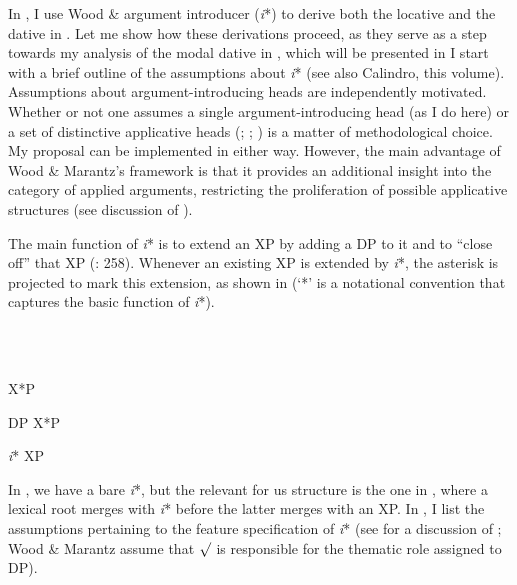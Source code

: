\documentclass[output=paper,modfonts,nonflat]{langsci/langscibook}
\begin{document}
In \citet{Tsedryk2019}, I use Wood \&  argument introducer (\textit{i}*) to derive both the locative and the dative in . Let me show how these derivations proceed, as they serve as a step towards my analysis of the modal dative in , which will be presented in  I start with a brief outline of the assumptions about \textit{i}* (see also Calindro, this volume). Assumptions about argument-introducing heads are independently motivated. Whether or not one assumes a single argument-introducing head (as I do here) or a set of distinctive applicative heads (\citealt{Pylkkänen2007}; \citealt{Cuervo2003}; \citealt{Markman2009}) is a matter of methodological choice. My proposal can be implemented in either way. However, the main advantage of Wood \& Marantz’s framework is that it provides an additional insight into the category of applied arguments, restricting the proliferation of possible applicative structures (see discussion of ).       

The main function of \textit{i}* is to extend an XP by adding a DP to it and to “close off” that XP (\citealt{WoodMarantz2017}: 258). Whenever an existing XP is extended by \textit{i}*, the asterisk is projected to mark this extension, as shown in  (‘*’ is a notational convention that captures the basic function of \textit{i}*). 

\ea%
    \label{ex:key:14}
    \gll\\
        \\
    \glt
    \z

          X*P

  DP  X*P


  \textit{i}*  XP

In , we have a bare \textit{i}*, but the relevant for us structure is the one in , where a lexical root merges with \textit{i}* before the latter merges with an XP. In , I list the assumptions pertaining to the feature specification of \textit{i}* (see \citealt{Tsedryk2019} for a discussion of ; Wood \& Marantz assume that  ${\surd}$  is responsible for the thematic role assigned to DP).  

\ea%
    \label{ex:key:15}
    \gll\\
        \\
    \glt
    \z
\end{document}
